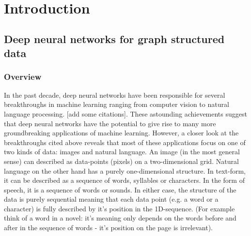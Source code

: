 \chapter{Introduction}
\label{chapter:Introduction}



\section{Deep neural networks for graph structured data}

\subsection{Overview}

In the past decade, deep neural networks have been responsible for several breakthroughs in machine learning ranging from computer vision to natural language processing. [add some citations]. These astounding achievements suggest that deep neural networks have the potential to give rise to many more groundbreaking applications of machine learning. However, a closer look at the breakthroughs cited above reveals that most of these applications focus on one of two kinds of data: images and natural language. An image (in the most general sense) can described as data-points (pixels) on a two-dimensional grid. Natural language on the other hand has a purely one-dimensional structure. In text-form, it can be described as a sequence of words, syllables or characters. In the form of speech, it is a sequence of words or sounds. In either case, the structure of the data is purely sequential meaning that each data point (e.g. a word or a character) is fully described by it's position in the 1D-sequence. (For example think of a word in a novel: it's meaning only depends on the words before and after in the sequence of words - it's position on the page is irrelevant).

